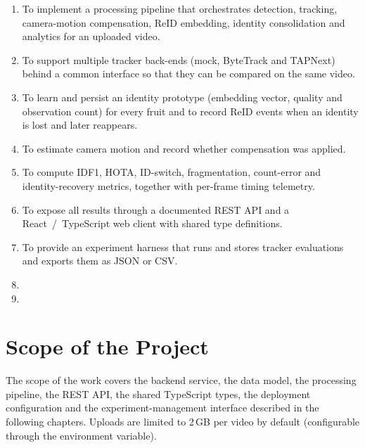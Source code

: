\begin{enumerate}
  \item To implement a processing pipeline that orchestrates detection, tracking, camera-motion compensation, ReID embedding, identity consolidation and analytics for an uploaded video.
  \item To support multiple tracker back-ends (mock, ByteTrack and TAPNext) behind a common interface so that they can be compared on the same video.
  \item To learn and persist an identity prototype (embedding vector, quality and observation count) for every fruit and to record ReID events when an identity is lost and later reappears.
  \item To estimate camera motion and record whether compensation was applied.
  \item To compute IDF1, HOTA, ID-switch, fragmentation, count-error and identity-recovery metrics, together with per-frame timing telemetry.
  \item To expose all results through a documented REST API and a React~/~TypeScript web client with shared type definitions.
  \item To provide an experiment harness that runs and stores tracker evaluations and exports them as JSON or CSV.
  \item {}
  \item {}
\end{enumerate}

\section{Scope of the Project}

The scope of the work covers the backend service, the data model, the processing pipeline, the REST API, the shared TypeScript types, the deployment configuration and the experiment-management interface described in the following chapters. Uploads are limited to 2\,GB per video by default (configurable through the  environment variable).


